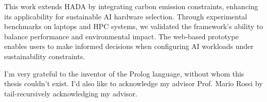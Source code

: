 \documentclass[a4paper,singleside,12pt]{report} %
\begin{document}
This work extends HADA by integrating carbon emission constraints, enhancing its applicability 
for sustainable AI hardware selection. Through experimental benchmarks on laptops and HPC systems, 
we validated the framework’s ability to balance performance and environmental impact. The web-based prototype 
enables users to make informed decisions when configuring AI workloads under sustainability constraints.

\appendix

\printbibliography[heading=bibintoc] %

\acknowledgements
I'm very grateful to the inventor of the Prolog language, without whom this thesis couldn't exist. I'd also like 
to acknowledge my advisor Prof. Mario Rossi by tail-recursively acknowledging my advisor.
	
\end{document}
